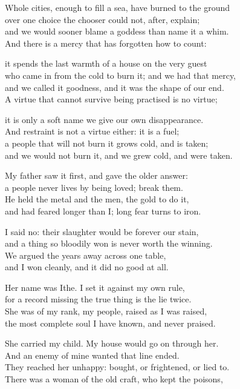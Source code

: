 \begin{founder}
Whole cities, enough to fill a sea, have burned to the ground\\
over one choice the chooser could not, after, explain;\\
and we would sooner blame a goddess than name it a whim.\\
And there is a mercy that has forgotten how to count:\\
\medskip

it spends the last warmth of a house on the very guest\\
who came in from the cold to burn it; and we had that mercy,\\
and we called it goodness, and it was the shape of our end.\\
A virtue that cannot survive being practised is no virtue;\\
\medskip

it is only a soft name we give our own disappearance.\\
And restraint is not a virtue either: it is a fuel;\\
a people that will not burn it grows cold, and is taken;\\
and we would not burn it, and we grew cold, and were taken.
\medskip

My father saw it first, and gave the older answer:\\
a people never lives by being loved; break them.\\
He held the metal and the men, the gold to do it,\\
and had feared longer than I; long fear turns to iron.\\
\medskip

I said no: their slaughter would be forever our stain,\\
and a thing so bloodily won is never worth the winning.\\
We argued the years away across one table,\\
and I won cleanly, and it did no good at all.\\
\medskip

Her name was Ithe. I set it against my own rule,\\
for a record missing the true thing is the lie twice.\\
She was of my rank, my people, raised as I was raised,\\
the most complete soul I have known, and never praised.\\
\medskip

She carried my child. My house would go on through her.\\
And an enemy of mine wanted that line ended.\\
They reached her unhappy: bought, or frightened, or lied to.\\
There was a woman of the old craft, who kept the poisons,\\
\medskip


\end{founder}
